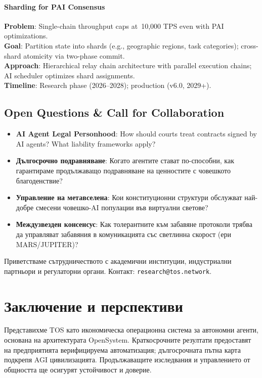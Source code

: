\documentclass[11pt]{article}
\begin{document}
\paragraph{Sharding for PAI Consensus}
\textbf{Problem}: Single-chain throughput caps at~10,000 TPS even with PAI optimizations.\\
\textbf{Goal}: Partition state into shards (e.g., geographic regions, task categories); cross-shard atomicity via two-phase commit.\\
\textbf{Approach}: Hierarchical relay chain architecture with parallel execution chains; AI scheduler optimizes shard assignments.\\
\textbf{Timeline}: Research phase (2026--2028); production (v6.0, 2029+).

\subsection{Open Questions \& Call for Collaboration}

\begin{itemize}[noitemsep]
  \item \textbf{AI Agent Legal Personhood}: How should courts treat contracts signed by AI agents? What liability frameworks apply?
  \item \textbf{Дългосрочно подравняване}: Когато агентите стават по-способни, как гарантираме продължаващо подравняване на ценностите с човешкото благоденствие?
  \item \textbf{Управление на метавселена}: Кои конституционни структури обслужват най-добре смесени човешко-AI популации във виртуални светове?
  \item \textbf{Междузвезден консенсус}: Как толерантните към забавяне протоколи трябва да управляват забавяния в комуникацията със светлинна скорост (ери MARS/JUPITER)?
\end{itemize}

Приветстваме сътрудничеството с академични институции, индустриални партньори и регулаторни органи. Контакт: \texttt{research@tos.network}.

\section{Заключение и перспективи}
Представихме TOS като икономическа операционна система за автономни агенти, основана на архитектурата OpenSystem. Краткосрочните резултати предоставят на предприятията верифицируема автоматизация; дългосрочната пътна карта подкрепя AGI цивилизацията. Продължаващите изследвания и управлението от общността ще осигурят устойчивост и доверие.
\end{document}
